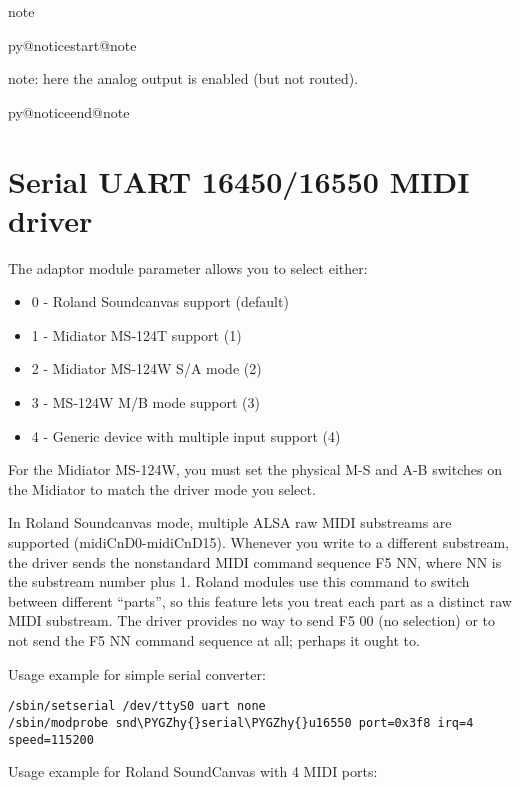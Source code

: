 \documentclass[a4paper,8pt,english]{sphinxmanual}
\makeatletter
\renewenvironment{notice}[2]{%
          \def\py@noticetype{#1}
          \begin{coloredbox}{#1}
          \bf\it
          \par\strong{#2}
          \csname py@noticestart@#1\endcsname
        }
	{
          \csname py@noticeend@\py@noticetype\endcsname
          \end{coloredbox}
        }
\def\PYGZhy{\char`\-}
\makeatother
\begin{document}
\begin{notice}{note}{Note:}
note: here the analog output is enabled (but not routed).
\end{notice}


\section{Serial UART 16450/16550 MIDI driver}
\label{sound/cards/serial-u16550::doc}\label{sound/cards/serial-u16550:serial-uart-16450-16550-midi-driver}
The adaptor module parameter allows you to select either:
\begin{itemize}
\item {} 
0 - Roland Soundcanvas support (default)

\item {} 
1 - Midiator MS-124T support (1)

\item {} 
2 - Midiator MS-124W S/A mode (2)

\item {} 
3 - MS-124W M/B mode support (3)

\item {} 
4 - Generic device with multiple input support (4)

\end{itemize}

For the Midiator MS-124W, you must set the physical M-S and A-B
switches on the Midiator to match the driver mode you select.

In Roland Soundcanvas mode, multiple ALSA raw MIDI substreams are supported
(midiCnD0-midiCnD15).  Whenever you write to a different substream, the driver
sends the nonstandard MIDI command sequence F5 NN, where NN is the substream
number plus 1.  Roland modules use this command to switch between different
``parts'', so this feature lets you treat each part as a distinct raw MIDI
substream. The driver provides no way to send F5 00 (no selection) or to not
send the F5 NN command sequence at all; perhaps it ought to.

Usage example for simple serial converter:

\begin{Verbatim}[commandchars=\\\{\}]
/sbin/setserial /dev/ttyS0 uart none
/sbin/modprobe snd\PYGZhy{}serial\PYGZhy{}u16550 port=0x3f8 irq=4 speed=115200
\end{Verbatim}

Usage example for Roland SoundCanvas with 4 MIDI ports:
\end{document}
